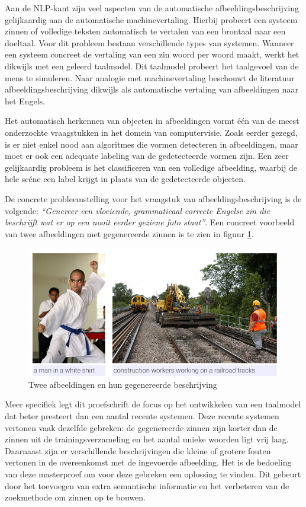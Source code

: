Aan de NLP-kant zijn veel aspecten van de automatische afbeeldingsbeschrijving gelijkaardig aan de automatische machinevertaling. Hierbij probeert een systeem zinnen of volledige teksten automatisch te vertalen van een brontaal naar een doeltaal. Voor dit probleem bestaan verschillende types van systemen. Wanneer een systeem concreet de vertaling van een zin woord per woord maakt, werkt het dikwijls met een geleerd taalmodel. Dit taalmodel probeert het taalgevoel van de mens te simuleren. Naar analogie met machinevertaling beschouwt de literatuur afbeeldingsbeschrijving dikwijls als automatische vertaling van afbeeldingen naar het Engels.

Het automatisch herkennen van objecten in afbeeldingen vormt \'e\'en van de meest onderzochte vraagstukken in het domein van computervisie. Zoals eerder gezegd, is er niet enkel nood aan algoritmes die vormen detecteren in afbeeldingen, maar moet er ook een adequate labeling van de gedetecteerde vormen zijn. Een zeer gelijkaardig probleem is het classificeren van een volledige afbeelding, waarbij de hele sc\'ene een label krijgt in plaats van de gedetecteerde objecten.

De concrete probleemstelling voor het vraagstuk van afbeeldingsbeschrijving is de volgende: \emph{``Genereer een vloeiende, grammaticaal correcte Engelse zin die beschrijft wat er op een nooit eerder geziene foto staat''}. Een concreet voorbeeld van twee afbeeldingen met gegenereerde zinnen is te zien in figuur \ref{fig:examplecaptions}.

\begin{figure}[tb]
    \centering
    \includegraphics[width= 0.85\linewidth]{Images/caption.png}
    \caption{Twee afbeeldingen en hun gegenereerde beschrijving}
    \label{fig:examplecaptions}
\end{figure}

Meer specifiek legt dit proefschrift de focus op het ontwikkelen van een taalmodel dat beter presteert dan een aantal recente systemen. Deze recente systemen vertonen vaak dezelfde gebreken: de gegenereerde zinnen zijn korter dan de zinnen uit de trainingsverzameling en het aantal unieke woorden ligt vrij laag. Daarnaast zijn er verschillende beschrijvingen die kleine of grotere fouten vertonen in de overeenkomst met de ingevoerde afbeelding. Het is de bedoeling van deze masterproef om voor deze gebreken een oplossing te vinden. Dit gebeurt door het toevoegen van extra semantische informatie en het verbeteren van de zoekmethode om zinnen op te bouwen.


